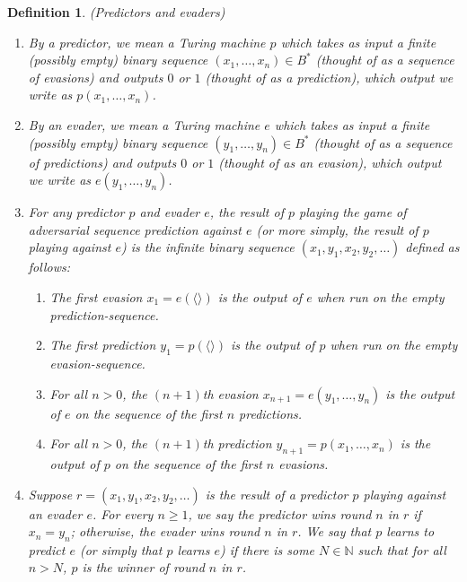 \documentclass{article}
\newtheorem{definition}[theorem]{Definition}
\begin{document}
\begin{definition}
\label{evaderpredictordefn}
    (Predictors and evaders)
    \begin{enumerate}
        \item
        By a \emph{predictor}, we mean a Turing machine $p$
        which takes as input a finite (possibly empty) binary sequence
        $(x_1,\ldots,x_n)\in B^*$
        (thought of as a sequence of \emph{evasions})
        and outputs $0$ or $1$ (thought of as a \emph{prediction}), which output
        we write as $p(x_1,\ldots,x_n)$.
        \item
        By an \emph{evader}, we mean a Turing machine $e$
        which takes as input a finite (possibly empty) binary sequence
        $(y_1,\ldots,y_n)\in B^*$
        (thought of as a sequence of \emph{predictions})
        and outputs $0$ or $1$ (thought of as an \emph{evasion}), which output
        we write as $e(y_1,\ldots,y_n)$.
        \item
        For any predictor $p$ and evader $e$, the \emph{result of $p$ playing the
        game of adversarial sequence
        prediction against $e$} (or more simply, the \emph{result of
        $p$ playing against $e$}) is the infinite binary sequence
        $(x_1,y_1,x_2,y_2,\ldots)$
        defined as follows:
        \begin{enumerate}
            \item
            The first evasion
            $x_1=e(\langle\rangle)$ is
            the output of $e$ when run on the empty prediction-sequence.
            \item
            The first prediction
            $y_1=p(\langle\rangle)$ is
            the output of $p$ when run on the empty evasion-sequence.
            \item
            For all $n>0$, the $(n+1)$th evasion
            $x_{n+1}=e(y_1,\ldots,y_n)$ is
            the output of $e$ on the sequence of the first $n$ predictions.
            \item
            For all $n>0$, the $(n+1)$th prediction
            $y_{n+1}=p(x_1,\ldots,x_n)$ is
            the output of $p$ on the sequence of the first $n$ evasions.
        \end{enumerate}
        \item
        Suppose $r=(x_1,y_1,x_2,y_2,\ldots)$ is the result of a predictor $p$ playing
        against an evader $e$. For every $n\geq 1$,
        we say \emph{the predictor wins round $n$ in $r$}
        if $x_n=y_n$; otherwise,
        \emph{the evader wins round $n$ in $r$}.
        We say that \emph{$p$ learns to predict $e$}
        (or simply that \emph{$p$ learns $e$}) if there is some $N\in\mathbb N$
        such that for all $n>N$, $p$ is the winner of round $n$ in $r$.
    \end{enumerate}
\end{definition}
\end{document}
